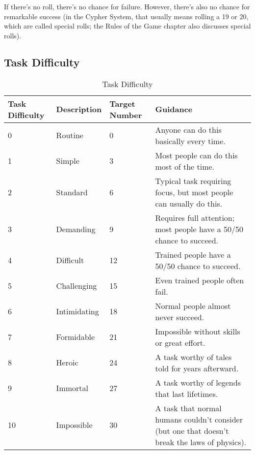 \documentclass[a4paper,10pt]{book}
\begin{document}
\begin{multicols}{2}
If there’s no roll, there’s no chance for failure. However, there’s also no chance for remarkable success (in the Cypher System, that usually means rolling a 19 or 20, which are called special rolls; the Rules of the Game chapter also discusses special rolls).

\subsection{Task Difficulty}

\end{multicols}

\begin{table}
\centering

\caption{Task Difficulty}
\label{tab:Task Difficulty}

\begin{tabularx}{\textwidth}{| p{} | p{} | p{} | p{} |}
\hline
\textbf{Task \newline Difficulty} & \textbf{Description} & \textbf{Target Number} & \textbf{Guidance} \\
\hline
0 & Routine & 0 & Anyone can do this basically every time.  \\ \hline
1 & Simple & 3 & Most people can do this most of the time.  \\ \hline
2 & Standard & 6 & Typical task requiring focus, but most people can usually do this.  \\ \hline
3 & Demanding & 9 & Requires full attention; most people have a 50/50 chance to succeed.  \\ \hline
4 & Difficult & 12 & Trained people have a 50/50 chance to succeed.  \\ \hline
5 & Challenging & 15 & Even trained people often fail.  \\ \hline
6 & Intimidating & 18 & Normal people almost never succeed.  \\ \hline
7 & Formidable & 21 & Impossible without skills or great effort.  \\ \hline
8 & Heroic & 24 & A task worthy of tales told for years afterward.  \\ \hline
9 & Immortal & 27 & A task worthy of legends that last lifetimes.  \\ \hline
10 & Impossible & 30 & A task that normal humans couldn’t consider (but one that doesn’t break the laws of physics).  \\ \hline

\end{tabularx}

\end{table}

\begin{multicols}{2}

\end{multicols}

\listoftables
\printindex
\end{document}
